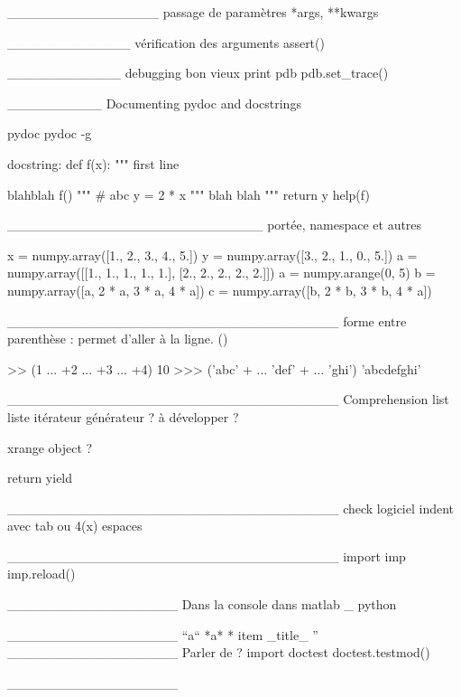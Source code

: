 ________________
passage de paramètres
*args, **kwargs 


_____________
vérification des arguments 
assert()

____________
debugging
bon vieux print
pdb
pdb.set_trace()

__________
Documenting pydoc and docstrings

pydoc
pydoc -g

docstring: 
def f(x): 
"""
first line

blahblah f()
"""
    # abc
    y = 2 * x
    """
blah
blah
  """
    return y
help(f)

___________________________
portée, namespace et autres 

x = numpy.array([1., 2., 3., 4., 5.])
y = numpy.array([3., 2., 1., 0., 5.])
a = numpy.array([[1., 1., 1., 1., 1.], [2., 2., 2., 2., 2.]])
a = numpy.arange(0, 5)
b = numpy.array([a, 2 * a, 3 * a, 4 * a])
c = numpy.array([b, 2 * b, 3 * b, 4 * a])

___________________________________
forme entre parenthèse : 
permet d'aller à la ligne. 
()
\begin{frame}
\begin{pythonConsole}
>> (1
... +2
... +3
... +4)
10
>>> ('abc' + 
... 'def' +
... 'ghi')
'abcdefghi'
\end{pythonConsole}
\end{frame}

___________________________________
Comprehension list
liste itérateur
générateur
? 
à développer ? 

xrange object ? 

return 
yield

___________________________________
check logiciel indent
avec tab ou 4(x) espaces


___________________________________
import imp
imp.reload()


__________________
Dans la console
dans matlab
_ python

__________________
``a`` 
*a*  
* item 
_title_ 
''
__________________
Parler de ? 
import doctest
doctest.testmod()

__________________



